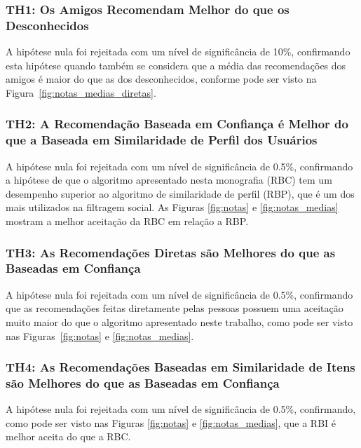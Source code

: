 \subsubsection{TH1: Os Amigos Recomendam Melhor do que os Desconhecidos}
A hipótese nula foi rejeitada com um nível de significância de 10\%, confirmando esta hipótese quando também se considera que a média das recomendações dos amigos é maior do que as dos desconhecidos, conforme pode ser visto na Figura~\ref{fig:notas_medias_diretas}.


\subsubsection{TH2: A Recomendação Baseada em Confiança é Melhor do que a Baseada em Similaridade de Perfil dos Usuários}
A hipótese nula foi rejeitada com um nível de significância de 0.5\%, confirmando a hipótese de que o algoritmo apresentado nesta monografia (RBC) tem um desempenho superior ao algoritmo de similaridade de perfil (RBP), que é um dos mais utilizados na filtragem social. As Figuras \ref{fig:notas} e \ref{fig:notas_medias} mostram a melhor aceitação da RBC em relação a RBP.

\subsubsection{TH3: As Recomendações Diretas são Melhores do que as Baseadas em Confiança}
A hipótese nula foi rejeitada com um nível de significância de 0.5\%, confirmando que as recomendações feitas diretamente pelas pessoas possuem uma aceitação muito maior do que o algoritmo apresentado neste trabalho, como pode ser visto nas Figuras~\ref{fig:notas} e \ref{fig:notas_medias}.

\subsubsection{TH4: As Recomendações Baseadas em Similaridade de Itens são Melhores do que as Baseadas em Confiança}
A hipótese nula foi rejeitada com um nível de significância de 0.5\%, confirmando, como pode ser visto nas Figuras \ref{fig:notas} e \ref{fig:notas_medias}, que a RBI é melhor aceita do que a RBC.

